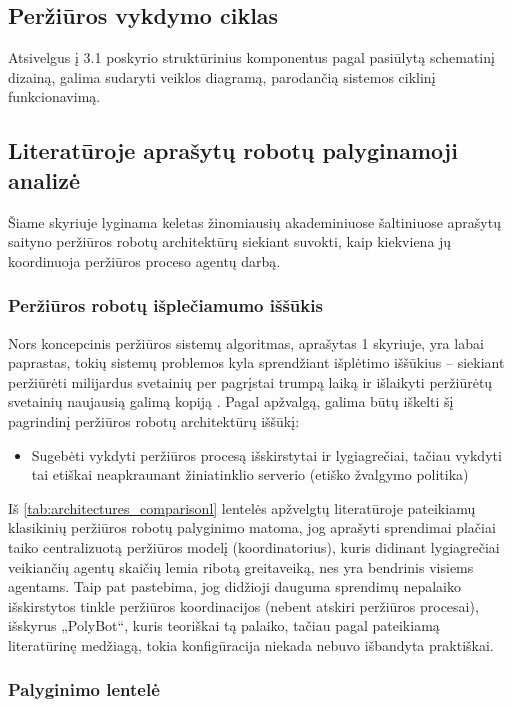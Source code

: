 \subsection{Peržiūros vykdymo ciklas}

Atsivelgus į 3.1 poskyrio struktūrinius komponentus pagal \cite{StanfWebCrawl} pasiūlytą schematinį dizainą, galima sudaryti veiklos diagramą, parodančią sistemos ciklinį funkcionavimą.



\subsection{Literatūroje aprašytų robotų palyginamoji analizė}

Šiame skyriuje lyginama keletas žinomiausių akademiniuose šaltiniuose aprašytų saityno peržiūros robotų architektūrų siekiant suvokti, kaip kiekviena jų koordinuoja peržiūros proceso agentų darbą.

\subsubsection{Peržiūros robotų išplečiamumo iššūkis}

Nors koncepcinis peržiūros sistemų algoritmas, aprašytas 1 skyriuje, yra labai paprastas, tokių sistemų problemos kyla sprendžiant išplėtimo iššūkius -- siekiant peržiūrėti milijardus svetainių per pagrįstai trumpą laiką ir išlaikyti peržiūrėtų svetainių naujausią galimą kopiją \cite{WCArchitectureMicrosoft}. Pagal \cite{WCArchitectureMicrosoft} apžvalgą, galima būtų iškelti šį pagrindinį peržiūros robotų architektūrų iššūkį:

\begin{itemize}
  \item Sugebėti vykdyti peržiūros procesą išskirstytai ir lygiagrečiai, tačiau vykdyti tai etiškai neapkraunant žiniatinklio serverio (etiško žvalgymo politika)
\end{itemize}





\pagebreak

Iš \ref{tab:architectures_comparisonl} lentelės apžvelgtų literatūroje pateikiamų klasikinių peržiūros robotų palyginimo matoma, jog aprašyti sprendimai plačiai taiko centralizuotą peržiūros modelį (koordinatorius), kuris didinant lygiagrečiai veikiančių agentų skaičių lemia ribotą greitaveiką, nes yra bendrinis visiems agentams. Taip pat pastebima, jog didžioji dauguma sprendimų nepalaiko išskirstytos tinkle peržiūros koordinacijos (nebent atskiri peržiūros procesai), išskyrus „PolyBot“, kuris teoriškai tą palaiko, tačiau pagal \cite{PolyBotArchitecture} pateikiamą literatūrinę medžiagą, tokia konfigūracija niekada nebuvo išbandyta praktiškai.
\subsubsection{Palyginimo lentelė}

